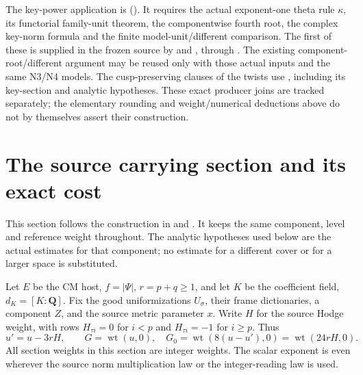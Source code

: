 The key-power application is
().
It requires the actual exponent-one theta rule \(\kappa\), its
functorial family-unit theorem, the componentwise fourth root,
the complex key-norm formula and the finite model-unit/different
comparison.
The first of these is supplied in the frozen source by
and , through
.
The existing component-root/different argument may be reused
only with those actual inputs and the same N3/N4 models.
The cusp-preserving clauses of the twists use
,
including its key-section and analytic hypotheses.
These exact producer joins are tracked separately; the elementary
rounding and weight/numerical deductions above do not by themselves
assert their construction.


\section{The source carrying section and its exact cost}
\label{sec:ftb-carrying-section}
This section follows the construction in
 and
.  It keeps the same component,
level and reference weight throughout.  The analytic hypotheses used below
are the actual estimates for that component; no estimate for a different
cover or for a larger space is substituted.

Let \(E\) be the CM host, \(f=|\Psi|\), \(r=p+q\geq1\), and let \(K\)
be the coefficient field, \(d_K=[K:\mathbf Q]\).
Fix the good uniformizations \(U_\sigma\), their frame dictionaries, a
component \(Z\), and the source metric parameter \(x\).
Write \(H\) for the source Hodge weight, with rows
\(H_{\tau i}=0\) for \(i<p\) and \(H_{\tau i}=-1\) for \(i\geq p\).
Thus
\[
 u'=u-3rH,\qquad
 G=\operatorname{wt}(u,0),\quad
 G_0=\operatorname{wt}(8(u-u'),0)=\operatorname{wt}(24rH,0).
\]
All section weights in this section are integer weights.
The scalar exponent is even wherever the source norm multiplication
law or the integer-reading law is used.

